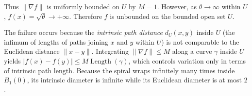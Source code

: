 \begin{exercisesolution}
\begin{enumerate}[label=\textbf{(\alph*)}]
    Thus $\|\nabla f\|$ is uniformly bounded on $U$ by $M = 1$.
    However, as $\theta \to \infty$ within $U$, $f(x) = \sqrt{\theta} \to +\infty$. Therefore $f$ is unbounded on the bounded open set $U$.
\end{enumerate}
\begin{remark}
The failure occurs because the \emph{intrinsic path distance} $d_U(x, y)$ inside $U$ (the infimum of
lengths of paths joining $x$ and $y$ within $U$) is not comparable to the Euclidean distance $\|x - y\|$.
Integrating $\|\nabla f\| \leq M$ along a curve $\gamma$ inside $U$ yields $|f(x) - f(y)| \leq M \operatorname{Length}(\gamma)$,
which controls variation only in terms of intrinsic path length. Because the spiral wraps infinitely many times
inside $B_1(0)$, its intrinsic diameter is infinite while its Euclidean diameter is at most $2$.
\end{remark}
\end{exercisesolution}


